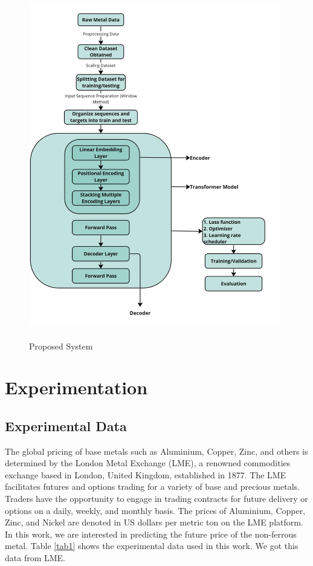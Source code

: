 \documentclass{ws-ijait}
\begin{document}
\begin{center}
	\begin{figure}[!htbp]
		\centering
		\includegraphics[width=11cm, height=15cm]{Transformer.jpg}
		\caption{Proposed System}
		\label{figpp}
	\end{figure}
\end{center}



\section{Experimentation}

\subsection{Experimental Data}
The global pricing of base metals such as Aluminium, Copper, Zinc, and others is determined by the London Metal Exchange (LME), a renowned commodities exchange based in London, United Kingdom, established in 1877. The LME facilitates futures and options trading for a variety of base and precious metals. Traders have the opportunity to engage in trading contracts for future delivery or options on a daily, weekly, and monthly basis. The prices of Aluminium, Copper, Zinc, and Nickel are denoted in US dollars per metric ton on the LME platform. In this work, we are interested in predicting the future price of the non-ferrous metal. Table \ref{tab1} shows the experimental data used in this work. We got this data from LME.
\end{document}
